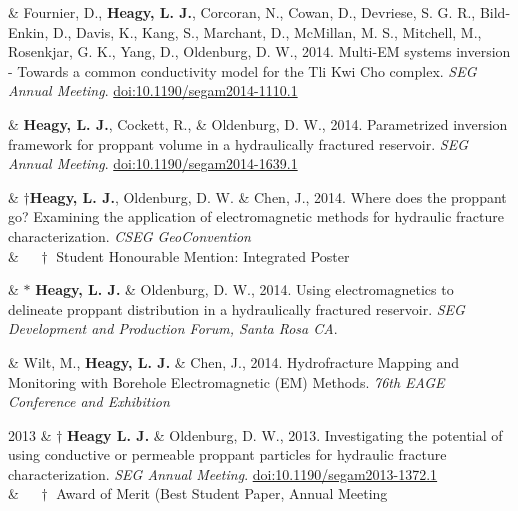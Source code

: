 \documentclass[a4paper, 11pt]{article}
\newcommand{\doi}[1]{\href{https://doi.org/#1}{doi:#1}}
\begin{document}
\begin{entryright}
& Fournier, D., \textbf{Heagy, L. J.}, Corcoran, N., Cowan, D., Devriese, S. G. R., Bild-Enkin, D., Davis, K., Kang, S., Marchant, D., McMillan, M. S., Mitchell, M., Rosenkjar, G. K., Yang, D., Oldenburg, D. W., 2014. Multi-EM systems inversion - Towards a common conductivity model for the Tli Kwi Cho complex. \emph{SEG Annual Meeting}. \doi{10.1190/segam2014-1110.1}
\end{entryright}

\begin{entryright}
& \textbf{Heagy, L. J.}, Cockett, R., \& Oldenburg, D. W., 2014. Parametrized inversion framework for proppant volume in a hydraulically fractured reservoir. \emph{SEG Annual Meeting}. \doi{10.1190/segam2014-1639.1}
\end{entryright}

\begin{entryright}
& $\dagger$\textbf{Heagy, L. J.}, Oldenburg, D. W. \& Chen, J., 2014. Where does the proppant go? Examining the application of electromagnetic methods for hydraulic fracture characterization. \emph{CSEG GeoConvention} \\
& $\quad \dagger$ Student Honourable Mention: Integrated Poster
\end{entryright}

\begin{entryright}
& $*$ \textbf{Heagy, L. J.} \& Oldenburg, D. W., 2014. Using electromagnetics to delineate proppant distribution in a hydraulically fractured reservoir. \emph{SEG Development and Production Forum, Santa Rosa CA}.
\end{entryright}

\begin{entryright}
& Wilt, M., \textbf{Heagy, L. J.} \& Chen, J., 2014. Hydrofracture Mapping and Monitoring with Borehole Electromagnetic (EM) Methods. \emph{76th EAGE Conference and Exhibition}
\end{entryright}

\begin{entryright}
2013 & $\dagger$ \textbf{Heagy L. J.} \& Oldenburg, D. W., 2013. Investigating the potential of using conductive or permeable proppant particles for hydraulic fracture characterization. \emph{SEG Annual Meeting}. \doi{10.1190/segam2013-1372.1} \\
& $\quad\dagger$ Award of Merit (Best Student Paper, Annual Meeting
\end{entryright}
\end{document}

